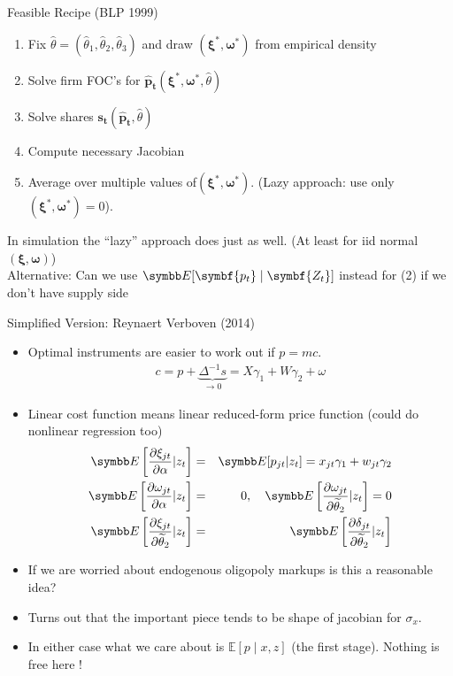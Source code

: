 \documentclass[aspectratio=169,10pt]{beamer}
\begin{document}
\begin{frame}{Feasible Recipe (BLP 1999)}
\begin{enumerate}
\item Fix $\widehat{\theta}=(\widehat{\theta}_1,\widehat{\theta}_2,\widehat{\theta}_3)$ and draw $(\symbf{\xi}^{*},\symbf{\omega}^{*})$ from empirical density
\item Solve firm FOC's for $\symbf{\hat{p}_{t}}(\symbf{\xi}^{*},\symbf{\omega}^{*},\widehat{\theta})$
\item Solve shares $\symbf{s_{t}}(\symbf{\hat{p}_{t}},\widehat{\theta})$
\item Compute necessary Jacobian
\item Average over multiple values of$(\symbf{\xi}^{*},\symbf{\omega}^{*})$. (Lazy approach: use only $(\symbf{\xi}^{*},\symbf{\omega}^{*})=0$).
\end{enumerate}
In simulation the ``lazy'' approach does just as well. (At least for iid normal $(\symbf{\xi},\symbf{\omega})$)\\

 Alternative: Can we use $\E[ \symbf{p_t} \mid \symbf{Z_t}]$ instead for (2) if we don't have supply side
\end{frame}



\begin{frame}{Simplified Version: Reynaert Verboven (2014)}
\begin{itemize}
\footnotesize
\item Optimal instruments are easier to work out if $p = mc$.
\begin{eqnarray*}
c = p  + \underbrace{\Delta^{-1} s}_{\rightarrow 0}  = X \gamma_1 + W \gamma_2 + \omega
\end{eqnarray*}
\item Linear cost function means linear reduced-form price function (could do nonlinear regression too)
\begin{eqnarray*}
\E\left[ \frac{\partial \xi_{jt} }{\partial \alpha} | z_t \right] &=& \E[p_{jt} | z_t] = x_{jt} \gamma_1 + w_{jt} \gamma_2\\
\E\left[ \frac{\partial \omega_{jt} }{\partial \alpha} | z_t \right] &=& 0 , \quad \E\left[ \frac{\partial \omega_{jt} }{\partial \widetilde{\theta}_2} | z_t \right] = 0\\
\E\left[ \frac{\partial \xi_{jt} }{\partial \widetilde{\theta}_2} | z_t \right] &=&\E\left[ \frac{\partial \delta_{jt} }{\partial \widetilde{\theta}_2} | z_t \right]\\
\end{eqnarray*}
\item If we are worried about endogenous oligopoly markups is this a reasonable idea?
\item Turns out that the important piece tends to be \alert{shape} of jacobian for $\sigma_x$.
\item In either case what we care about is $\mathbb{E}[p \mid x, z]$ (the \alert{first stage}). Nothing is free here !
\end{itemize}
\end{frame}
\end{document}
